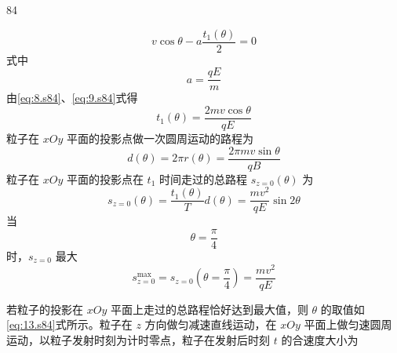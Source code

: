 \begin{solution}{84}
\begin{subsolution}
\begin{subsubsolution}
\begin{subsubsubsolution}
\begin{subsubsubsubsolution}
                    \begin{equation}
                        v\cos\theta - a \frac{t_{1}(\theta)}{2} = 0
                        \label{eq:8.s84}
                    \end{equation}
                    式中
                    \begin{equation}
                        a = \frac{q E}{m}
                        \label{eq:9.s84}
                    \end{equation}
                    由\eqref{eq:8.s84}、\eqref{eq:9.s84}式得
                    \begin{equation}
                        t_{1}(\theta) = \frac{2 m v \cos\theta}{q E}
                        \label{eq:10.s84}
                    \end{equation}
                    粒子在 $xOy$ 平面的投影点做一次圆周运动的路程为
                    \begin{equation}
                        d(\theta) = 2\pi r(\theta) = \frac{2\pi m v \sin\theta}{q B}
                        \label{eq:11.s84}
                    \end{equation}
                    粒子在 $xOy$ 平面的投影点在 $t_{1}$ 时间走过的总路程 $s_{z=0}(\theta)$ 为
                    \begin{equation}
                        s_{z=0}(\theta) = \frac{t_{1}(\theta)}{T} d(\theta) = \frac{m v^{2}}{q E} \sin 2\theta
                        \label{eq:12.s84}
                    \end{equation}
                    当
                    \begin{equation}
                        \theta = \frac{\pi}{4}
                        \label{eq:13.s84}
                    \end{equation}
                    时，$s_{z=0}$ 最大
                    \begin{equation}
                        s_{z=0}^{\max} = s_{z=0}\left(\theta=\frac{\pi}{4}\right) = \frac{m v^{2}}{q E}
                        \label{eq:14.s84}
                    \end{equation}
                \end{subsubsubsubsolution}
                \begin{subsubsubsubsolution}
                    若粒子的投影在 $xOy$ 平面上走过的总路程恰好达到最大值，则 $\theta$ 的取值如\eqref{eq:13.s84}式所示。粒子在 $z$ 方向做匀减速直线运动，在 $xOy$ 平面上做匀速圆周运动，以粒子发射时刻为计时零点，粒子在发射后时刻 $t$ 的合速度大小为

\end{subsubsubsubsolution}
\end{subsubsubsolution}
\end{subsubsolution}
\end{subsolution}
\end{solution}
